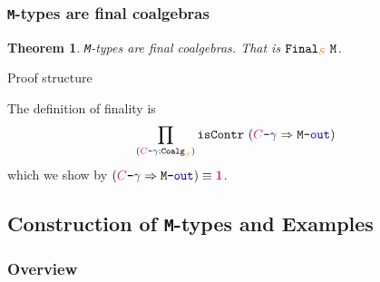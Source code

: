 \documentclass[xelatex,mathserif,serif,notheorems]{beamer} %
\theoremstyle{plain} %
\newtheorem{thm}{Theorem}[section]
\theoremstyle{definition}
\theoremstyle{remark}
\newcommand*{\type}[1]{\textcolor{magenta!90!black}{#1}}
\newcommand*{\container}[1]{\textcolor{orange}{#1}}
\newcommand*{\unit}{\type{\textbf{1}}}
\newcommand*{\coalg}[2]{#1\texttt{-}#2}
\newcommand*{\function}[1]{\textcolor{blue!60!black}{\ensuremath{\mathtt{#1}}}}
\newcommand*{\typeformer}[1]{\ensuremath{\mathtt{#1}}}
\newcommand{\setlengths}{
  \setlength{\abovedisplayskip}{4pt}
  \setlength{\belowdisplayskip}{4pt}
  \setlength{\abovedisplayshortskip}{2pt}
  \setlength{\belowdisplayshortskip}{2pt}
}
\begin{document}
\begin{frame}
  \frametitle{\texttt{M}-types are final coalgebras}
  \begin{thm}\setlengths
    \texttt{M}-types are final coalgebras. That is \(\typeformer{Final}_{\container{S}}~\typeformer{M}\).
  \end{thm}
  \pause
  \begin{block}{Proof structure}\setlengths
    The definition of finality is
    \begin{equation}
      \prod_{(\coalg{\type{C}}{\function{\gamma}} : \mathtt{Coalg}_{\container{S}})} \mathtt{isContr}~(\coalg{\type{C}}{\function{\gamma}} \Rightarrow \coalg{\typeformer{M}}{\function{out}})
    \end{equation}
    which we show by \((\coalg{\type{C}}{\function{\gamma}} \Rightarrow \coalg{\typeformer{M}}{\function{out}}) \equiv \unit\).
  \end{block}
\end{frame}

\subsection{Construction of \texttt{M}-types and Examples}
\begin{frame}
  \frametitle{Overview}
  \tableofcontents[currentsubsection]
\end{frame}
\end{document}
